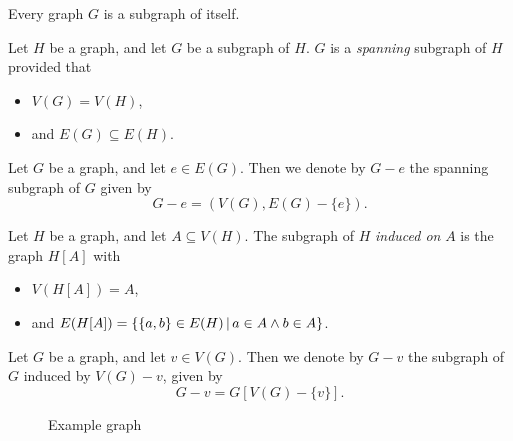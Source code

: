 \begin{rmk}
    Every graph $G$ is a subgraph of itself.
\end{rmk}

\begin{defn}
    Let $H$ be a graph, and let $G$ be a subgraph of $H$. $G$ is a \emph{spanning} subgraph of $H$ provided that
    \begin{itemize}
        \item $V(G) = V(H)$,
        \item and $E(G) \subseteq E(H)$.
    \end{itemize}
\end{defn}

\begin{defn}
    Let $G$ be a graph, and let $e \in E(G)$. Then we denote by $G - e$ the spanning subgraph of $G$ given by \[G - e = (V(G), E(G) - \{e\}).\]
\end{defn}

\begin{defn}
    Let $H$ be a graph, and let $A \subseteq V(H)$. The subgraph of $H$ \emph{induced on} $A$ is the graph $H[A]$ with
    \begin{itemize}
        \item $V(H[A]) = A$,
        \item and $E(H[A]) = \left\{\{a, b\} \in E(H) \,\middle|\, a \in A \land b \in A\right\}$.
    \end{itemize}
\end{defn}

\begin{defn}
    Let $G$ be a graph, and let $v \in V(G)$. Then we denote by $G - v$ the subgraph of $G$ induced by $V(G) - v$, given by \[G - v = G[V(G) - \{v\}].\]
\end{defn}

\begin{figure}[ht!]
    \centering
\caption{Example graph}
\label{fig:clique-examples}
\end{figure}

